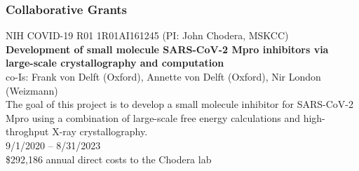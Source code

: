 \documentclass[10pt]{article}
\begin{document}

% 






\subsubsection*{Collaborative Grants}

NIH COVID-19 R01 1R01AI161245 (PI: John Chodera, MSKCC) \\
{\bf Development of small molecule SARS-CoV-2 Mpro inhibitors via large-scale crystallography and computation} \\
co-Is: Frank von Delft (Oxford), Annette von Delft (Oxford), Nir London (Weizmann) \\
The goal of this project is to develop a small molecule inhibitor for SARS-CoV-2 Mpro using a combination of large-scale free energy calculations and high-throghput X-ray crystallography. \\
9/1/2020 -- 8/31/2023 \\
\$292,186 annual direct costs to the Chodera lab
\end{document}
